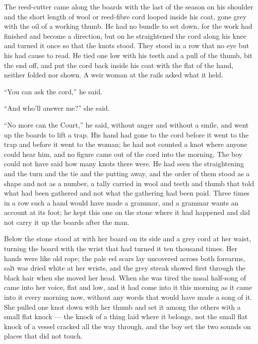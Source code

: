 \scenebreak

The reed-cutter came along the boards with the last of the season on his shoulder and the short length of wool or reed-fibre cord looped inside his coat, gone grey with the oil of a working thumb. He had no bundle to set down, for the work had finished and become a direction, but on  he straightened the cord along his knee and turned it once so that the knots stood. They stood in a row that no eye but his had cause to read. He tied one low with his teeth and a pull of the thumb, bit the end off, and put the cord back inside his coat with the flat of the hand, neither folded nor shown. A weir woman at the rails asked what it held.

“You can ask the cord,” he said.

“And who'll answer me?” she said.

“No more can the Court,” he said, without anger and without a smile, and went up the boards to lift a trap. His hand had gone to the cord before it went to the trap and before it went to the woman; he had not counted a knot where anyone could hear him, and no figure came out of the cord into the morning. The boy could not have said how many knots there were. He had seen the straightening and the turn and the tie and the putting away, and the order of them stood as a shape and not as a number, a tally carried in wool and teeth and thumb that told what had been gathered and not what the gathering had been paid. Three times in a row such a hand would have made a grammar, and a grammar wants an account at its foot; he kept this one on the stone where it had happened and did not carry it up the boards after the man.

Below the stone  stood at  with her board on its side and a grey cord at her waist, turning the board with the wrist that had turned it ten thousand times. Her hands were like old rope; the pale eel scars lay uncovered across both forearms, salt was dried white at her wrists, and the grey streak showed first through the black hair when she moved her head. When she was tired the nasal half-song of  came into her voice, flat and low, and it had come into it this morning as it came into it every morning now, without any words that would have made a song of it. She pulled one knot down with her thumb and set it among the others with a small flat knock --- the knock of a thing laid where it belongs, not the small flat knock of a vessel cracked all the way through, and the boy set the two sounds on places that did not touch.


